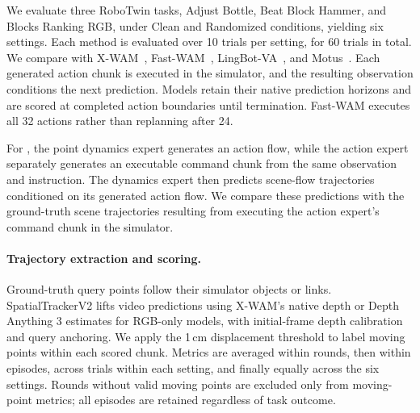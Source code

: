 We evaluate three RoboTwin tasks, Adjust Bottle, Beat Block Hammer, and
Blocks Ranking RGB, under Clean and Randomized conditions, yielding six
settings. Each method is evaluated over 10 trials per setting, for 60
trials in total. We compare with X-WAM~\citep{guo2026xwam},
Fast-WAM~\citep{yuan2026fastwam}, LingBot-VA~\citep{li2026lingbotva},
and Motus~\citep{bi2025motus}. Each generated action chunk is executed
in the simulator, and the resulting observation conditions the next
prediction. Models retain their native prediction horizons and are
scored at completed action boundaries until termination. Fast-WAM
executes all 32 actions rather than replanning after 24.

For \method{}, the point dynamics expert generates an action flow, while the action
expert separately generates an executable command chunk from the same
observation and instruction. The dynamics expert then predicts scene-flow
trajectories conditioned on its generated action flow. We compare these
predictions with the ground-truth scene trajectories resulting from
executing the action expert's command chunk in the simulator.

\paragraph{Trajectory extraction and scoring.}
Ground-truth query points follow their simulator objects or links.
SpatialTrackerV2 lifts video predictions using X-WAM's native depth or
Depth Anything 3 estimates for RGB-only models, with initial-frame depth
calibration and query anchoring. We apply the 1\,cm displacement threshold
to label moving points within each scored chunk. Metrics are averaged
within rounds, then within episodes, across trials within each setting,
and finally equally across the six settings. Rounds without valid moving points are excluded only from
moving-point metrics; all episodes are retained regardless of task outcome.

